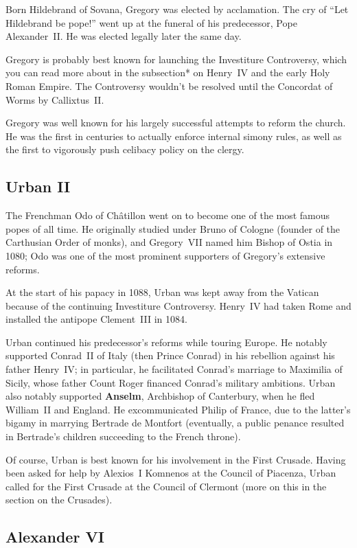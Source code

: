 Born Hildebrand of Sovana, Gregory was elected by acclamation.
The cry of ``Let Hildebrand be pope!'' went up at the funeral of his predecessor,
Pope Alexander~II\@.
He was elected legally later the same day.

Gregory is probably best known for launching the Investiture Controversy,
which you can read more about in the subsection* on Henry~IV and the early Holy Roman Empire.
The Controversy wouldn't be resolved until the Concordat of Worms by Callixtus~II\@.

Gregory was well known for his largely successful attempts to reform the church.
He was the first in centuries to actually enforce internal simony rules,
as well as the first to vigorously push celibacy policy on the clergy.

\subsection*{Urban II}

The Frenchman Odo of Ch\^atillon went on to become one of the most famous popes of all time.
He originally studied under Bruno of Cologne (founder of the Carthusian Order of monks),
and Gregory~VII named him Bishop of Ostia in 1080;
Odo was one of the most prominent supporters of Gregory's extensive reforms.

At the start of his papacy in 1088,
Urban was kept away from the Vatican because of the continuing Investiture Controversy.
Henry~IV had taken Rome and installed the antipope Clement~III in 1084.

Urban continued his predecessor's reforms while touring Europe.
He notably supported Conrad~II of Italy (then Prince Conrad)
in his rebellion against his father Henry~IV\@;
in particular, he facilitated Conrad's marriage to Maximilia of Sicily,
whose father Count Roger financed Conrad's military ambitions.
Urban also notably supported \textbf{Anselm}, Archbishop of Canterbury,
when he fled William~II and England.
He excommunicated Philip of France, due to the latter's bigamy in marrying Bertrade de Montfort
(eventually, a public penance resulted in Bertrade's children succeeding to the French throne).

Of course, Urban is best known for his involvement in the First Crusade.
Having been asked for help by Alexios~I Komnenos at the Council of Piacenza,
Urban called for the First Crusade at the Council of Clermont
(more on this in the section on the Crusades).

\subsection*{Alexander VI}

